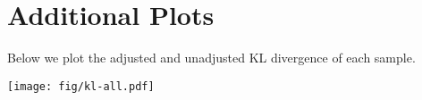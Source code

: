 \documentclass[letterpaper]{article}
\begin{document}
\section{Additional Plots}

Below we plot the adjusted and unadjusted KL divergence of each sample.

\texttt{[image: fig/kl-all.pdf]}




\end{document}

